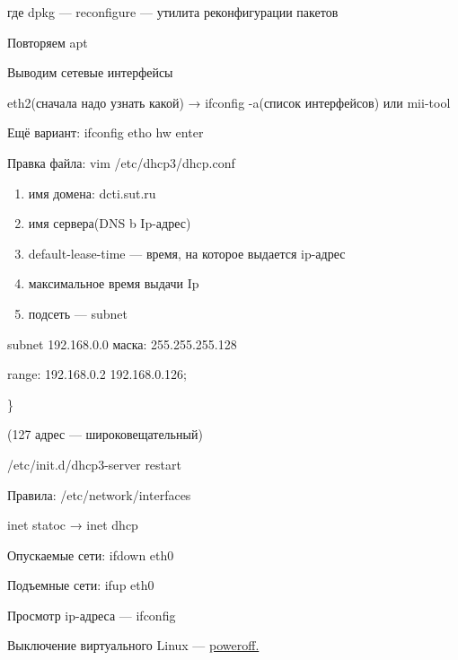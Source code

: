 \par 
где dpkg — reconfigure — утилита реконфигурации
пакетов
\par 
Повторяем apt
\par 
Выводим сетевые интерфейсы
\par eth2(сначала
надо узнать какой) →
ifconfig -a(список интерфейсов) или mii-tool
\par 
Ещё вариант: ifconfig etho hw enter
\par 
Правка файла: vim /etc/dhcp3/dhcp.conf
\begin{enumerate}
	\item \par 
	имя домена: dcti.sut.ru
	\item \par 
	имя сервера(DNS b Ip-адрес)
	\item \par 
	default-lease-time — время, на которое выдается
	ip-адрес
	\item \par 
	максимальное время выдачи Ip
	\item \par 
	подсеть — subnet
\end{enumerate}
\par 
subnet 192.168.0.0 маска: 255.255.255.128
\par 
range: 192.168.0.2  192.168.0.126;
\par 
\}
\par 
(127 адрес — широковещательный)
\par 
/etc/init.d/dhcp3-server restart
\par 
Правила: /etc/network/interfaces
\par inet
statoc →
inet dhcp
\par 
Опускаемые сети: ifdown eth0
\par 
Подъемные сети: ifup eth0
\par 
Просмотр ip-адреса — ifconfig
\par Выключение
виртуального Linux — \underline{poweroff.}
\par 
\\

